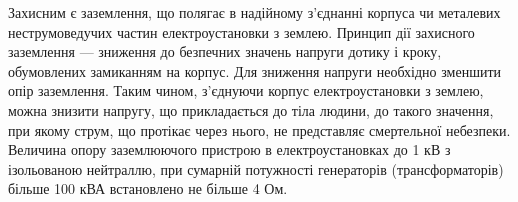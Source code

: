 \documentclass[ukrainian,utf8,simple,floatsingle,hpadding=5mm]{eskdtext}
\begin{document}
Захисним є заземлення, що полягає в надійному з'єднанні  корпуса чи  металевих неструмоведучих 
частин електроустановки з землею. Принцип дії захисного заземлення --- зниження до безпечних значень 
напруги дотику і кроку, обумовлених замиканням на корпус. Для зниження напруги необхідно зменшити 
опір заземлення. Таким чином, з'єднуючи корпус електроустановки з землею, можна знизити напругу, 
що прикладається до тіла людини, до такого значення, при якому струм, що протікає через нього, не 
представляє  смертельної небезпеки. Величина опору заземлюючого пристрою  в електроустановках до
1 кВ з ізольованою нейтраллю, при сумарній потужності генераторів (трансформаторів) більше 100 кВА
встановлено не більше 4 Ом.
\end{document}
